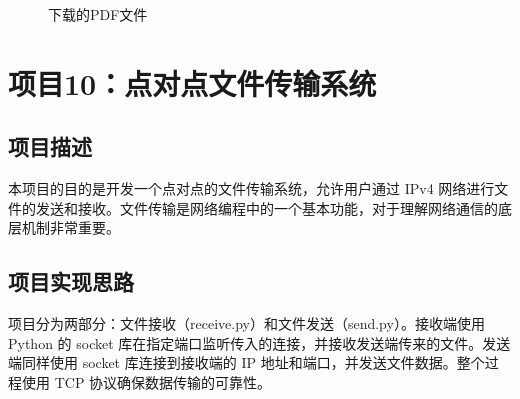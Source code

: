 \documentclass[UTF8,titlepage]{ctexart}
\numberwithin{figure}{section}
\begin{document}
\begin{figure}[H]
\centering
 \caption{下载的PDF文件}
 \label{}
\end{figure}
\clearpage
\section{项目10：点对点文件传输系统}
\subsection{项目描述}
本项目的目的是开发一个点对点的文件传输系统，允许用户通过 IPv4 网络进行文件的发送和接收。文件传输是网络编程中的一个基本功能，对于理解网络通信的底层机制非常重要。

\subsection{项目实现思路}
项目分为两部分：文件接收（receive.py）和文件发送（send.py）。接收端使用 Python 的 socket 库在指定端口监听传入的连接，并接收发送端传来的文件。发送端同样使用 socket 库连接到接收端的 IP 地址和端口，并发送文件数据。整个过程使用 TCP 协议确保数据传输的可靠性。
\end{document}
